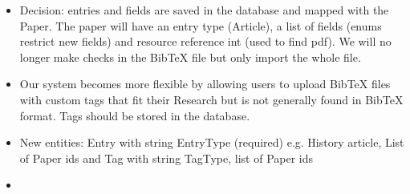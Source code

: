 \begin{itemize}
	\item Decision: entries and fields are saved in the database and mapped with the Paper. The paper will have an entry type (Article), a list of fields (enums restrict new fields) and resource reference int (used to find pdf). We will no longer make checks in the BibTeX file but only import the whole file. 
	\item Our system becomes more flexible by allowing users to upload BibTeX files with custom tags that fit their Research but is not generally found in BibTeX format. Tags should be stored in the database. 
	\item New entities: Entry with string EntryType (required) e.g. History article, List of Paper ids and Tag with string TagType, list of Paper ids 
	\item 
\end{itemize}